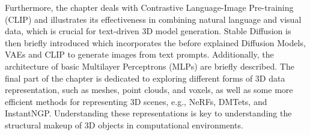Furthermore, the chapter deals with Contrastive Language-Image Pre-training (CLIP) \citep{radfordCLIP} and illustrates its effectiveness in combining natural language and visual data, which is crucial for text-driven 3D model generation. Stable Diffusion \citep{rombachStableDiffusion} is then briefly introduced which incorporates the before explained Diffusion Models, VAEs and CLIP to generate images from text prompts. Additionally, the architecture of basic Multilayer Perceptrons (MLPs) are briefly described. The final part of the chapter is dedicated to exploring different forms of 3D data representation, such as meshes, point clouds, and voxels, as well as some more efficient methods for representing 3D scenes, e.g., NeRFs, DMTets, and InstantNGP\@. Understanding these representations is key to understanding the structural makeup of 3D objects in computational environments.









